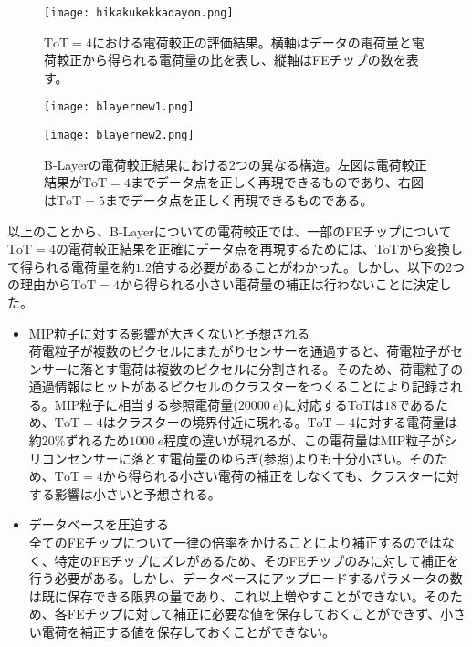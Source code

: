 \begin{figure}[tbp]
  \centering
  \texttt{[image: hikakukekkadayon.png]}
  \caption[$\mathrm{ToT}=4$における電荷較正の評価結果]{$\mathrm{ToT}=4$における電荷較正の評価結果。横軸はデータの電荷量と電荷較正から得られる電荷量の比を表し、縦軸はFEチップの数を表す。}
  \label{fig:hikakukekkadayon}
\end{figure}

\begin{figure}[tbp]
  \begin{minipage}[b]{0.5\linewidth}
    \centering
    \texttt{[image: blayernew1.png]}
  \end{minipage}
  \begin{minipage}[b]{0.5\linewidth}
    \centering
    \texttt{[image: blayernew2.png]}
  \end{minipage}
  \caption[B-Layerの電荷較正結果における2つの異なる構造]{B-Layerの電荷較正結果における2つの異なる構造。左図は電荷較正結果が$\mathrm{ToT}=4$までデータ点を正しく再現できるものであり、右図は$\mathrm{ToT}=5$までデータ点を正しく再現できるものである。}
  \label{fig:blayernew}
\end{figure}

以上のことから、B-Layerについての電荷較正では、一部のFEチップについて$\mathrm{ToT}=4$の電荷較正結果を正確にデータ点を再現するためには、ToTから変換して得られる電荷量を約$1.2$倍する必要があることがわかった。しかし、以下の2つの理由から$\mathrm{ToT}=4$から得られる小さい電荷量の補正は行わないことに決定した。
\begin{itemize}
  \item MIP粒子に対する影響が大きくないと予想される\\
  荷電粒子が複数のピクセルにまたがりセンサーを通過すると、荷電粒子がセンサーに落とす電荷は複数のピクセルに分割される。そのため、荷電粒子の通過情報はヒットがあるピクセルのクラスターをつくることにより記録される。MIP粒子に相当する参照電荷量($20000\ \si{e}$)に対応するToTは$18$であるため、$\mathrm{ToT}=4$はクラスターの境界付近に現れる。$\mathrm{ToT}=4$に対する電荷量は約$20\%$ずれるため$1000\ \si{e}$程度の違いが現れるが、この電荷量はMIP粒子がシリコンセンサーに落とす電荷量のゆらぎ(参照)よりも十分小さい。そのため、$\mathrm{ToT}=4$から得られる小さい電荷の補正をしなくても、クラスターに対する影響は小さいと予想される。
  \item データベースを圧迫する\\
  全てのFEチップについて一律の倍率をかけることにより補正するのではなく、特定のFEチップにズレがあるため、そのFEチップのみに対して補正を行う必要がある。しかし、データベースにアップロードするパラメータの数は既に保存できる限界の量であり、これ以上増やすことができない。そのため、各FEチップに対して補正に必要な値を保存しておくことができず、小さい電荷を補正する値を保存しておくことができない。
\end{itemize}

